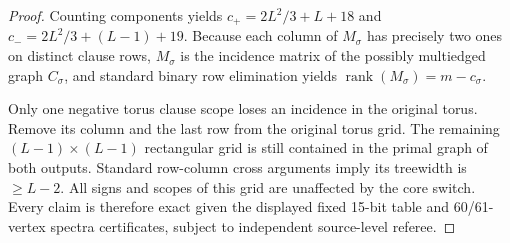 \documentclass[10pt]{article}
\begin{document}
\begin{proof}
Counting components yields $c_+=2L^2/3+L+18$ and $c_-=2L^2/3+(L-1)+19$. Because each column of $M_\sigma$ has precisely two ones on distinct clause rows, $M_\sigma$ is the incidence matrix of the possibly multiedged graph $C_\sigma$, and standard binary row elimination yields $\operatorname{rank}(M_\sigma)=m-c_\sigma$.

Only one negative torus clause scope loses an incidence in the original torus. Remove its column and the last row from the original torus grid. The remaining $(L-1)\times(L-1)$ rectangular grid is still contained in the primal graph of both outputs. Standard row-column cross arguments imply its treewidth is $\ge L-2$. All signs and scopes of this grid are unaffected by the core switch. Every claim is therefore exact given the displayed fixed 15-bit table and 60/61-vertex spectra certificates, subject to independent source-level referee.
\end{proof}
\end{document}
